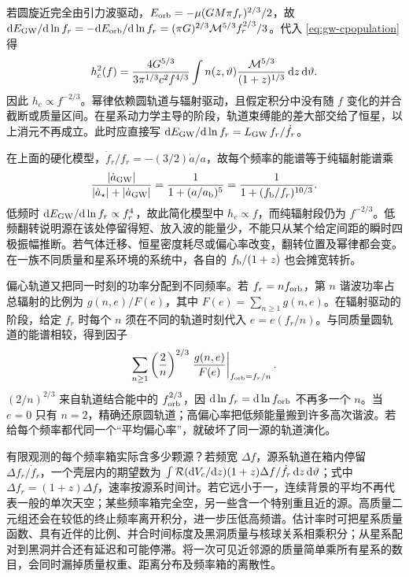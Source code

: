 若圆旋近完全由引力波驱动，$E_{\rm orb}=-\mu(GM\pi f_r)^{2/3}/2$，故 $\dd E_{\rm GW}/\dd\ln f_r=-\dd E_{\rm orb}/\dd\ln f_r=(\pi G)^{2/3}\mathcal M^{5/3}f_r^{2/3}/3$。代入 \eqref{eq:gw-cpopulation} 得
\[
 h_c^2(f)=\frac{4G^{5/3}}{3\pi^{1/3} c^2 f^{4/3}}
   \int n(z,\vartheta)\frac{\mathcal M^{5/3}}{(1+z)^{1/3}}
      \,\dd z\,\dd\vartheta .
\]
因此 $h_c\propto f^{-2/3}$。幂律依赖圆轨道与辐射驱动，且假定积分中没有随 $f$ 变化的并合截断或质量区间。在星系动力学主导的阶段，轨道束缚能的差大部交给了恒星，以上消元不再成立。此时应直接写 $\dd E_{\rm GW}/\dd\ln f_r=L_{\rm GW}\,f_r/\dot f_r$。

在上面的硬化模型，$\dot f_r/f_r=-(3/2)\dot a/a$，故每个频率的能谱等于纯辐射能谱乘
\[
 \frac{|\dot a_{\rm GW}|}{|\dot a_\star|+|\dot a_{\rm GW}|}
 =\frac{1}{1+(a/a_{\rm b})^5}
 =\frac{1}{1+(f_{\rm b}/f_r)^{10/3}} .
\]
低频时 $\dd E_{\rm GW}/\dd\ln f_r\propto f_r^4$，故此简化模型中 $h_c\propto f$，而纯辐射段仍为 $f^{-2/3}$。低频翻转说明源在该处停留得短、放入波的能量少，不能只从某个给定间距的瞬时四极振幅推断。若气体迁移、恒星密度耗尽或偏心率改变，翻转位置及幂律都会变。在一族不同质量和星系环境的系统中，各自的 $f_{\rm b}/(1+z)$ 也会摊宽转折。

偏心轨道又把同一时刻的功率分配到不同频率。若 $f_r=n f_{\rm orb}$，第 $n$ 谐波功率占总辐射的比例为 $g(n,e)/F(e)$，其中 $F(e)=\sum_{n\ge1}g(n,e)$。在辐射驱动的阶段，给定 $f_r$ 时每个 $n$ 须在不同的轨道时刻代入 $e=e(f_r/n)$。与同质量圆轨道的能谱相较，得到因子
\[
 \sum_{n\ge1}\left(\frac2n\right)^{2/3}
      \left.\frac{g(n,e)}{F(e)}\right|_{f_{\rm orb}=f_r/n}.
\]
$(2/n)^{2/3}$ 来自轨道结合能中的 $f_{\rm orb}^{2/3}$，因 $\dd\ln f_r=\dd\ln f_{\rm orb}$ 不再多一个 $n$。当 $e=0$ 只有 $n=2$，精确还原圆轨道；高偏心率把低频能量搬到许多高次谐波。若给每个频率都代同一个“平均偏心率”，就破坏了同一源的轨道演化。

有限观测的每个频率箱实际含多少颗源？若频宽 $\Delta f$，源系轨道在箱内停留 $\Delta f_r/\dot f_r$，一个壳层内的期望数为 $\int{\cal R}(\dd V_c/\dd z)(1+z)\Delta f/\dot f_r\,\dd z\,\dd\vartheta$；式中 $\Delta f_r=(1+z)\Delta f$，速率按源系时间计。若它远小于一，连续背景的平均不再代表一般的单次天空；某些频率箱完全空，另一些含一个特别重且近的源。高质量二元组还会在较低的终止频率离开积分，进一步压低高频谱。估计率时可把星系质量函数、具有近伴的比例、并合时间标度及黑洞质量与核球关系相乘积分；从星系配对到黑洞并合还有延迟和可能停滞。将一次可见近邻源的质量简单乘所有星系的数目，会同时漏掉质量权重、距离分布及频率箱的离散性。


